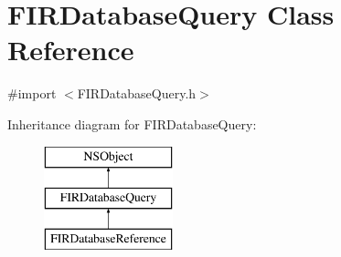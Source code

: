 \hypertarget{interface_f_i_r_database_query}{}\section{F\+I\+R\+Database\+Query Class Reference}
\label{interface_f_i_r_database_query}


{\ttfamily \#import $<$F\+I\+R\+Database\+Query.\+h$>$}

Inheritance diagram for F\+I\+R\+Database\+Query\+:\begin{figure}[H]
\begin{center}
\leavevmode
\includegraphics[height=3.000000cm]{interface_f_i_r_database_query}
\end{center}
\end{figure}
